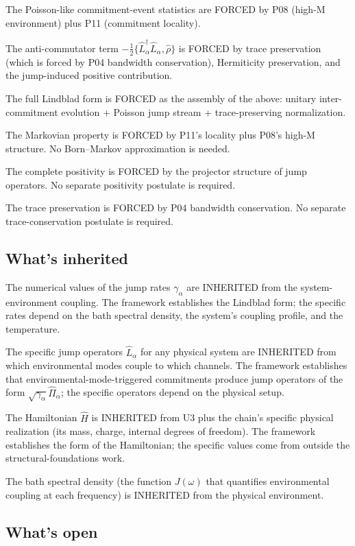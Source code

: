 \documentclass[11pt,a4paper]{article}
\begin{document}
The Poisson-like commitment-event statistics are FORCED by P08 (high-M environment) plus P11 (commitment locality).

The anti-commutator term $-\tfrac{1}{2}\{\hat L_\alpha^\dagger\hat L_\alpha, \hat\rho\}$ is FORCED by trace preservation (which is forced by P04 bandwidth conservation), Hermiticity preservation, and the jump-induced positive contribution.

The full Lindblad form is FORCED as the assembly of the above: unitary inter-commitment evolution + Poisson jump stream + trace-preserving normalization.

The Markovian property is FORCED by P11's locality plus P08's high-M structure. No Born--Markov approximation is needed.

The complete positivity is FORCED by the projector structure of jump operators. No separate positivity postulate is required.

The trace preservation is FORCED by P04 bandwidth conservation. No separate trace-conservation postulate is required.

\subsection{What's inherited}

The numerical values of the jump rates $\gamma_\alpha$ are INHERITED from the system-environment coupling. The framework establishes the Lindblad form; the specific rates depend on the bath spectral density, the system's coupling profile, and the temperature.

The specific jump operators $\hat L_\alpha$ for any physical system are INHERITED from which environmental modes couple to which channels. The framework establishes that environmental-mode-triggered commitments produce jump operators of the form $\sqrt{\gamma_\alpha}\hat\Pi_\alpha$; the specific operators depend on the physical setup.

The Hamiltonian $\hat H$ is INHERITED from U3 plus the chain's specific physical realization (its mass, charge, internal degrees of freedom). The framework establishes the form of the Hamiltonian; the specific values come from outside the structural-foundations work.

The bath spectral density (the function $J(\omega)$ that quantifies environmental coupling at each frequency) is INHERITED from the physical environment.

\subsection{What's open}
\end{document}
